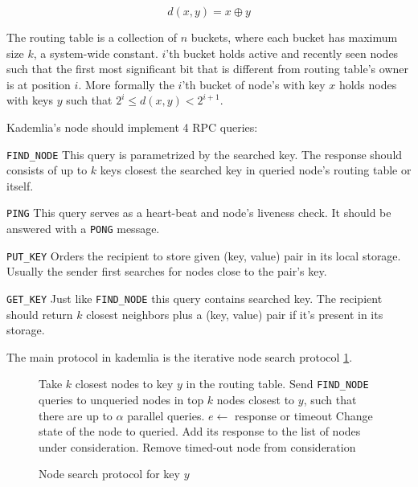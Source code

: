   \[ d(x, y) = x \oplus y\]

  The routing table is a collection of $n$ buckets, where each bucket has
  maximum size $k$, a system-wide constant. 
  $i$'th bucket holds active and recently seen nodes such that the first most
  significant bit that is different from routing table's owner is at position
  $i$. More formally the $i$'th bucket of node's with key $x$ holds nodes with
  keys $y$ such that $2^i \leq d(x, y) < 2^{i+1}$.

  Kademlia's node should implement 4 RPC queries:

  \begin{description}
    \item{\verb|FIND_NODE|} This query is parametrized by the searched key. The
      response should consists of up to $k$ keys closest the searched key in
      queried node's routing table or itself.
    \item{\verb|PING|} This query serves as a heart-beat and node's liveness
      check. It should be answered with a \verb|PONG| message.
    \item{\verb|PUT_KEY|} Orders the recipient to store given (key, value) pair
      in its local storage. Usually the sender first searches for nodes close
      to the pair's key.
    \item{\verb|GET_KEY|} Just like \verb|FIND_NODE| this query contains
      searched key. The recipient should return $k$ closest neighbors plus a
      (key, value) pair if it's present in its storage.
  \end{description}

  The main protocol in kademlia is the iterative node search protocol
  \ref{fig:node_search_alg}.

  \begin{figure}
    \label{fig:node_search_alg}
    \begin{algorithmic}[1]
    \STATE Take $k$ closest nodes to key $y$ in the routing table.
    \STATE Send \verb|FIND_NODE| queries to unqueried nodes in top $k$ 
    nodes closest to $y$, such that there are up to $\alpha$ parallel queries.
    \STATE $e \leftarrow$ response or timeout
      \STATE Change state of the node to queried. Add its response to the list
      of
      nodes under consideration.
    \ELSE
      \STATE Remove timed-out node from consideration
    \ENDIF
    \ENDWHILE
  \end{algorithmic}
    \caption{Node search protocol for key $y$}
  \end{figure}

